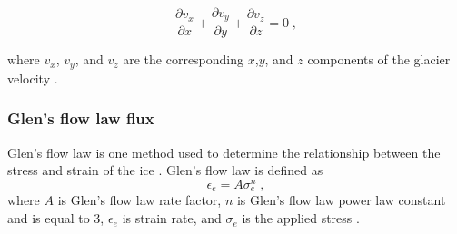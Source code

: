 \documentclass{article}
\begin{document}
\begin{equation} \label{mass conservation}
\frac{\partial v_x}{\partial x} + \frac{\partial v_y}{\partial y}  +\frac{\partial v_z}{\partial z} =0   \; ,
\end{equation}

where $v_x$, $v_y$, and $v_z$ are the corresponding $x$,$y$, and $z$ components of the glacier velocity \citep{LEMEUR2004,soucek2008}. 

\subsubsection{Glen's flow law flux}
Glen's flow law is one method used to determine the relationship between the stress and strain of the ice  \citep{AHLKRONA2016}. Glen's flow law is defined as
\begin{equation}\label{Glen}
\epsilon_e = A \sigma^n_e \; ,
\end{equation}
where $A$ is Glen’s flow law rate factor, $n$ is Glen’s flow law power law constant and is equal to 3, $\epsilon_e$ is strain rate, and $\sigma_e$ is the applied stress \citep{Hooke2013, Nye1952,Jarosch2013, AHLKRONA2016}.
\end{document}
